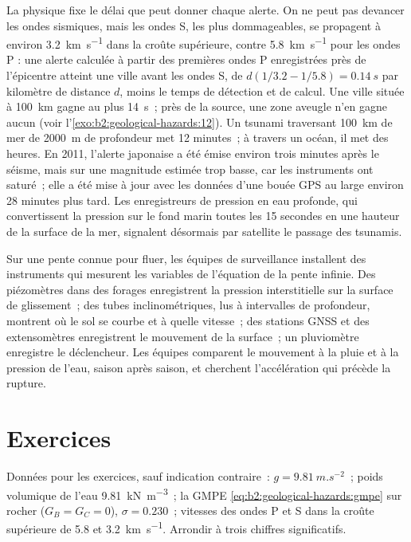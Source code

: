 La physique fixe le délai que peut donner chaque alerte. On ne peut pas devancer les ondes sismiques, mais les
ondes S, les plus dommageables, se propagent à environ \qty{3.2}{km.s^{-1}} dans la croûte supérieure, contre
\qty{5.8}{km.s^{-1}} pour les ondes P : une alerte calculée à partir des premières ondes P enregistrées près de
l'épicentre atteint une ville avant les ondes S, de $d(1/3.2 - 1/5.8) = \qty{0.14}{s}$ par kilomètre de distance
$d$, moins le temps de détection et de calcul. Une ville située à \qty{100}{km} gagne au plus \qty{14}{s}~; près
de la source, une zone aveugle n'en gagne aucun (voir l'\cref{exo:b2:geological-hazards:12}). Un tsunami traversant
\qty{100}{km} de mer de \qty{2000}{m} de profondeur met 12 minutes~; à travers un océan, il met des heures. En 2011,
l'alerte japonaise a été émise environ trois minutes après le séisme, mais sur une magnitude estimée trop basse,
car les instruments ont saturé~; elle a été mise à jour avec les données d'une bouée GPS au large environ 28 minutes
plus tard. Les enregistreurs de pression en eau profonde, qui convertissent la pression sur le fond marin toutes
les 15 secondes en une hauteur de la surface de la mer, signalent désormais par satellite le passage des tsunamis.

\begin{inthefield}
Sur une pente connue pour fluer, les équipes de surveillance installent des instruments qui mesurent les
variables de l'équation de la pente infinie. Des piézomètres dans des forages enregistrent la pression
interstitielle sur la surface de glissement~; des tubes inclinométriques, lus à intervalles de profondeur,
montrent où le sol se courbe et à quelle vitesse~; des stations GNSS et des extensomètres enregistrent le
mouvement de la surface~; un pluviomètre enregistre le déclencheur. Les équipes comparent le mouvement à la
pluie et à la pression de l'eau, saison après saison, et cherchent l'accélération qui précède la rupture.
\end{inthefield}

\section*{Exercices}\label{sec:b2:geological-hazards:exercises}

Données pour les exercices, sauf indication contraire~: $g = \qty{9.81}{m.s^{-2}}$~; poids
volumique de l'eau \qty{9.81}{kN.m^{-3}}~; la GMPE \eqref{eq:b2:geological-hazards:gmpe}
sur rocher ($G_B = G_C = 0$), $\sigma = 0.230$~; vitesses des ondes P et S dans la croûte
supérieure de 5.8 et \qty{3.2}{km.s^{-1}}. Arrondir à trois chiffres significatifs.

